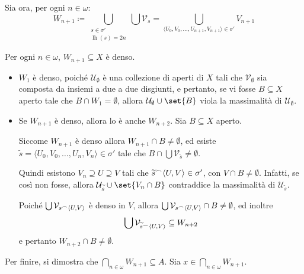 \documentclass{article}
\newcommand{\1}{\mathds{1}}
\renewcommand{\tilde}[1]{\widetilde{#1}}
\newcommand{\concat}{\null^{\frown}} %
\begin{document}
Sia ora, per ogni \(n \in\omega\):
\begin{equation*}
W_{n+1} \coloneqq \bigcup_{\substack{s \in \sigma'\\
\operatorname{lh}(s) = 2n}} \bigcup \mathcal{V}_{s} = \bigcup_{\langle U_{0},V_{0},\dots, U_{n+1}, V_{n+1}\rangle \in \sigma'} V_{n+1}
\end{equation*}

Per ogni \(n \in \omega\), \(W_{n+1} \subseteq X\) è denso.
\begin{itemize}
\item \(W_{1}\) è denso, poiché \(\mathcal{U}_{\emptyset}\) è una collezione di aperti di \(X\) tali che \(\mathcal{V}_{\emptyset}\) sia composta da insiemi a due a due disgiunti, e pertanto, se vi fosse \(B \subseteq X\) aperto tale che \(B\cap W_{1} = \emptyset\), allora \(\mathcal{U}_{\emptyset}\cup\set{B}\) viola la massimalità di \(\mathcal{U}_{\emptyset}\).
\item Se \(W_{n+1}\) è denso, allora lo è anche \(W_{n+2}\). Sia \(B \subseteq X\) aperto.

Siccome \(W_{n+1}\) è denso allora \(W_{n+1}\cap B\neq \emptyset\), ed esiste \(\tilde{s} = \langle U_{0},V_{0},\dots,U_{n}, V_{n}\rangle \in \sigma'\) tale che \(B\cap\bigcup \mathcal{V}_{\tilde{s}} \neq \emptyset\).

Quindi esistono \(V_{n}\supseteq U \supseteq V\) tali che \(\tilde{s}\concat \langle U, V\rangle \in \sigma'\), con \(V\cap B\neq \emptyset\). Infatti, se così non fosse, allora \(\mathcal{U}_{\tilde{s}}\cup\set{V_{n}\cap B}\) contraddice la massimalità di \(\mathcal{U}_{\tilde{s}}\).

Poiché \(\bigcup \mathcal{V}_{s\concat \langle U, V\rangle}\) è denso in \(V\), allora \(\bigcup \mathcal{V}_{s\concat \langle U, V\rangle} \cap B \neq \emptyset\), ed inoltre
\begin{equation*}
  \bigcup \mathcal{V}_{\tilde{s}\concat \langle U, V\rangle} \subseteq W_{n+2}
\end{equation*}
e pertanto \(W_{n+2}\cap B\neq \emptyset\).
\end{itemize}

Per finire, si dimostra che \(\bigcap_{n \in \omega} W_{n+1} \subseteq A\). Sia \(x \in \bigcap_{n \in \omega} W_{n+1}\).
\end{document}
